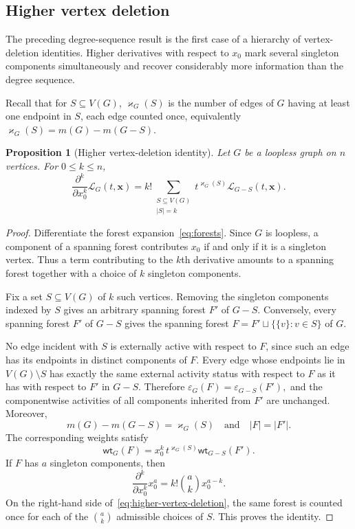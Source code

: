 \documentclass[11pt]{article}
\theoremstyle{plain}
\newtheorem{proposition}[theorem]{Proposition}
\theoremstyle{definition}
\renewcommand{\mathcal}{\mathscr}
\newcommand{\LL}{\mathcal{L}}    %
\newcommand{\bx}{\mathbf{x}}
\newcommand{\wt}{\mathsf{wt}}
\newcommand{\eps}{\varepsilon}
\newcommand{\kp}{\varkappa}
\numberwithin{equation}{section}
\begin{document}
\subsection{Higher vertex deletion}\label{subsec:induced-edge-profile}

The preceding degree-sequence result is the first case of a hierarchy of
vertex-deletion identities.  Higher derivatives with respect to $x_0$ mark
several singleton components simultaneously and recover considerably more
information than the degree sequence.

Recall that for $S\subseteq V(G)$, $\kp_G(S)$ is the number of edges of $G$
having at least one endpoint in $S$, each edge counted once, equivalently
$\kp_G(S)=m(G)-m(G-S)$.

\begin{proposition}[Higher vertex-deletion identity]
\label{prop:higher-vertex-deletion}
Let $G$ be a loopless graph on $n$ vertices.  For $0\le k\le n$,
\begin{equation}\label{eq:higher-vertex-deletion}
   \frac{\partial^k}{\partial x_0^k}\LL_G(t,\bx)
   =
   k!\sum_{\substack{S\subseteq V(G)\\ |S|=k}}
      t^{\kp_G(S)}\LL_{G-S}(t,\bx).
\end{equation}
\end{proposition}

\begin{proof}
Differentiate the forest expansion~\eqref{eq:forests}.  Since $G$ is
loopless, a component of a spanning forest contributes $x_0$ if and only if
it is a singleton vertex.  Thus a term contributing to the $k$th derivative
amounts to a spanning forest together with a choice of $k$ singleton
components.

Fix a set $S\subseteq V(G)$ of $k$ such vertices.  Removing the singleton
components indexed by $S$ gives an arbitrary spanning forest $F'$ of $G-S$.
Conversely, every spanning forest $F'$ of $G-S$ gives the spanning forest $F=F'\sqcup\{\{v\}:v\in S\}$  of $G$.

No edge incident with $S$ is externally active with respect to $F$, since such an edge has its endpoints in distinct components of $F$.
Every edge whose endpoints lie in $V(G)\setminus S$ has exactly the same external activity status
with respect to $F$ as it has with respect to $F'$ in $G-S$. Therefore   $\eps_G(F)=\eps_{G-S}(F'),$
and the componentwise activities of all components inherited from $F'$ are unchanged.  Moreover,
\[
 m(G)-m(G-S)=\kp_G(S)    \quad \text{and} \quad    |F|=|F'|.
\]
The corresponding weights satisfy
\[
   \wt_G(F)
   =
   x_0^k\,t^{\kp_G(S)}\wt_{G-S}(F').
\]
If $F$ has $a$ singleton components, then
\[
   \frac{\partial^k}{\partial x_0^k}x_0^a
   =k!\binom ak x_0^{a-k}.
\]
On the right-hand side of~\eqref{eq:higher-vertex-deletion}, the same forest
is counted once for each of the $\binom ak$ admissible choices of $S$.
This proves the identity.
\end{proof}
\end{document}

